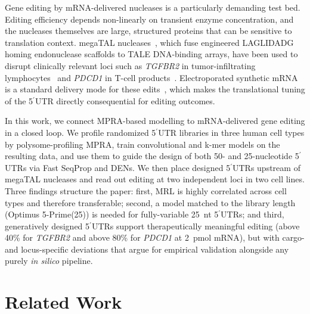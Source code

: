\documentclass[11pt]{article}
\begin{document}
Gene editing by mRNA-delivered nucleases is a particularly demanding
test bed. Editing efficiency depends non-linearly on transient enzyme
concentration, and the nucleases themselves are large, structured
proteins that can be sensitive to translation context. megaTAL
nucleases~\citep{mcmurrough2018laglidadg,laforet2019endonuclease,
gwiazda2016tcellediting}, which fuse engineered LAGLIDADG homing
endonuclease scaffolds to TALE DNA-binding arrays, have been used to
disrupt clinically relevant loci such as \emph{TGFBR2} in
tumor-infiltrating lymphocytes~\citep{fix2022tgfbr2} and \emph{PDCD1}
in T-cell
products~\citep{mohammad2025pd1}. Electroporated synthetic mRNA is
a standard delivery mode for these
edits~\citep{schwarze2021electroporation,gwiazda2016tcellediting},
which makes the translational tuning of the 5$^\prime$UTR directly
consequential for editing outcomes.

In this work, we connect MPRA-based modelling to mRNA-delivered
gene editing in a closed loop. We profile randomized 5$^\prime$UTR
libraries in three human cell types by polysome-profiling MPRA, train
convolutional and k-mer models on the resulting data, and use them to
guide the design of both 50- and 25-nucleotide 5$^\prime$UTRs via Fast
SeqProp and DENs. We then place designed 5$^\prime$UTRs upstream of
megaTAL nucleases and read out editing at two independent loci in two
cell lines. Three findings structure the paper: first, MRL is highly
correlated across cell types and therefore transferable; second, a
model matched to the library length (Optimus 5-Prime(25)) is needed
for fully-variable 25~nt 5$^\prime$UTRs; and third, generatively
designed 5$^\prime$UTRs support therapeutically meaningful editing
(above 40\% for \emph{TGFBR2} and above 80\% for \emph{PDCD1} at
2~pmol mRNA), but with cargo- and locus-specific deviations that argue
for empirical validation alongside any purely \emph{in silico}
pipeline.

\section{Related Work}
\end{document}
